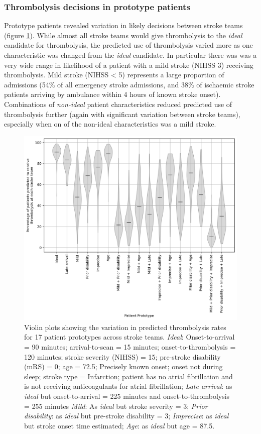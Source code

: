 \subsubsection{Thrombolysis decisions in prototype patients}

Prototype patients revealed variation in likely decisions between stroke teams (figure \ref{fig:thrombolysis_rates_prototype_patients}). While almost all stroke teams would give thrombolysis to the \textit{ideal} candidate for thrombolysis, the predicted use of thrombolysis varied more as one characteristic was changed from the \textit{ideal} candidate. In particular there was was a very wide range in likelihood of a patient with a mild stroke (NIHSS 3) receiving thrombolysis. Mild stroke (NIHSS < 5) represents a large proportion of admissions (54\% of all emergency stroke admissions, and 38\% of ischaemic stroke patients arriving by ambulance within 4 hours of known stroke onset). Combinations of \textit{non-ideal} patient characteristics reduced predicted use of thrombolysis further (again with significant variation between stroke teams), especially when on of the non-ideal characteristics was a mild stroke.

\begin{figure}
    \centering
    \includegraphics[width=0.75\linewidth]{images/prototype_patients_all_teams}
    \caption{Violin plots showing the variation in predicted thrombolysis rates for 17 patient prototypes across stroke teams. \textit{Ideal}: Onset-to-arrival = 90 minutes; arrival-to-scan = 15 minutes; onset-to-thrombolysis = 120 minutes; stroke severity (NIHSS) = 15; pre-stroke disability (mRS) = 0; age = 72.5; Precisely known onset; onset not during sleep; stroke type = Infarction; patient has no atrial fibrillation and is not receiving anticoagulants for atrial fibrillation; \textit{Late arrival}: as \textit{ideal} but onset-to-arrival = 225 minutes and onset-to-thrombolysis = 255 minutes \textit{Mild}: As \textit{ideal} but stroke severity = 3; \textit{Prior disability}: as \textit{ideal} but pre-stroke disability = 3; \textit{Imprecise}: as \textit{ideal} but stroke onset time estimated; \textit{Age}: as \textit{ideal} but age = 87.5.}
    \label{fig:thrombolysis_rates_prototype_patients}
\end{figure}

